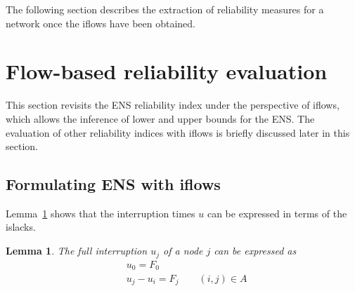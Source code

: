 \documentclass{article}
\newtheorem{lemma}{Lemma}
\begin{document}
The following section describes the extraction of reliability measures for a network once the iflows have been obtained. 

\section{Flow-based reliability evaluation} \label{sec:Eval}


This section revisits the ENS reliability index under the perspective of iflows, which allows the inference of lower and upper bounds for the ENS.
The evaluation of other reliability indices with iflows is briefly discussed later in this section.

\subsection{Formulating ENS with iflows} \label{ssec:ENSiflow}

Lemma~\ref{lemma1} shows that the interruption times $u$ can be expressed in terms of the islacks.

\begin{lemma} \label{lemma1}
	The full interruption $u_j$ of a node $j$ can be expressed as
	\begin{subequations}
	\begin{align} 
		& \displaystyle u_0 = F_0 \label{eq:ttimeFrecA} \\
		& \displaystyle u_j - u_i = F_j \qquad (i,j) \in A \label{eq:ttimeFrecB}
	\end{align}
	\end{subequations}
\end{lemma}
\end{document}
